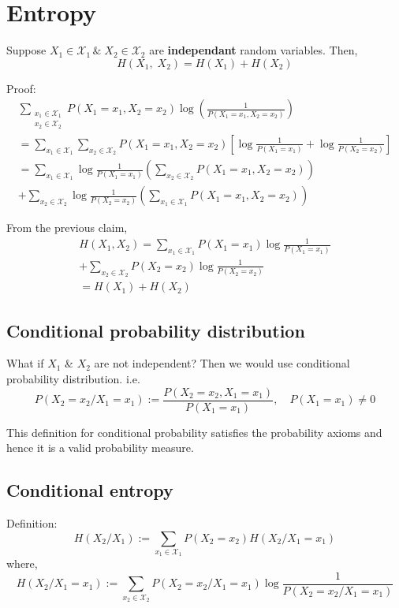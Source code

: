 \documentclass{article}
\begin{document}
\section{Entropy}

Suppose $X_1 \in \mathcal{X}_1\, \&\; X_2 \in \mathcal{X}_2$ are \textbf{independant} random variables. Then,
$$ H(X_1,\;X_2)=H(X_1)+H(X_2)$$

Proof:
\begin{gather*}
    \sum_{ \substack{x_1 \in \mathcal{X}_1 \\ x_2 \in \mathcal{X}_2}} P(X_1=x_1,X_2=x_2) \log \left( \frac{1}{P(X_1=x_1,X_2=x_2)} \right) \\
    = \sum_{x_1 \in \mathcal{X}_1 }\sum_{x_2 \in \mathcal{X}_2} P(X_1=x_1,X_2=x_2) \left[  \log \frac{1}{P(X_1=x_1)} + \log \frac{1}{P(X_2=x_2)}\right] \\
    = \sum_{x_1 \in \mathcal{X}_1 } \log \frac{1}{P(X_1=x_1)} \left( \sum_{x_2 \in \mathcal{X}_2} P(X_1=x_1,X_2=x_2)\right) \\
    + \sum_{x_2 \in \mathcal{X}_2 } \log \frac{1}{P(X_2=x_2)} \left( \sum_{x_1 \in \mathcal{X}_1} P(X_1=x_1,X_2=x_2)\right)
\end{gather*}

From the previous claim,
\begin{gather*}
    H(X_1,X_2)= \sum_{x_1 \in \mathcal{X}_1}P(X_1=x_1) \log \frac{1}{P(X_1=x_1)} \\
    + \sum_{x_2 \in \mathcal{X}_2}P(X_2=x_2) \log \frac{1}{P(X_2=x_2)} \\
    =H(X_1)+H(X_2)
\end{gather*}

\subsection{Conditional probability distribution}

What if $X_1$ \& $X_2$ are not independent? Then we would use conditional probability distribution. i.e.
$$ P(X_2=x_2/X_1=x_1):= \frac{P(X_2=x_2, X_1=x_1)}{P(X_1=x_1)}, \quad P(X_1=x_1) \neq 0 $$

This definition for conditional probability satisfies the probability axioms and hence it is a valid probability measure.

\subsection{Conditional entropy}
Definition:
$$ H(X_2/X_1):= \sum_{x_1 \in \mathcal{X}_1} P(X_2=x_2) H(X_2/X_1=x_1)$$
where,
$$ H(X_2/X_1=x_1):= \sum_{x_2 \in \mathcal{X}_2}P(X_2=x_2/X_1=x_1) \log \frac{1}{P(X_2=x_2/X_1=x_1)}$$
\end{document}
